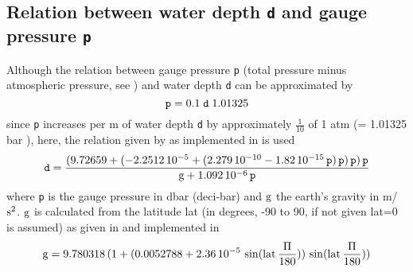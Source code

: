 \documentclass[a4paper]{article}
\begin{document}
\subsection{Relation between water depth \texttt{d} and gauge pressure \texttt{p}}
Although the relation between gauge pressure \texttt{p} (total pressure minus atmospheric pressure, see \cite{Feistel2008})  and water depth \texttt{d} can be approximated by 
\begin{equation}
 \rm \mbox{\texttt{p}} = 0.1\;\mbox{\texttt{d}}\;1.01325
\end{equation}
since \texttt{p} increases per m of water depth \texttt{d} by approximately $\frac{1}{10}$ of 1 atm (= 1.01325 bar \citet[chap. 5, p. 3]{Dickson2007}),
here, the relation given by \cite{Fofonoff1983} as implemented in \cite{marelac} is used
\begin{equation}
\rm \mbox{\texttt{d}} = \frac{(9.72659 + (-2.2512\,10^{-5} + (2.279\,10^{-10} - 1.82\,10^{-15} \, \mbox{\texttt{p}}) \, \mbox{\texttt{p}})\, \mbox{\texttt{p}})\, \mbox{\texttt{p}}}{g + 1.092\,10^{-6} \, \mbox{\texttt{p}}}
\end{equation}
where \mbox{\texttt{p}} is the gauge pressure in dbar (deci-bar) and $\rm g$ the earth's gravity in m/$\rm s^2$. $\rm g$ is calculated from the latitude lat (in degrees, -90 to 90, if not given lat=0 is assumed) as given in \cite{Fofonoff1983}
and implemented in \cite{marelac}
\begin{equation}
\rm g = 9.780318\, (1+ ( 0.0052788 + 2.36\,10^{-5}\,\sin(lat\,\frac{\Pi}{180}))\,\sin(lat\,\frac{\Pi}{180}))
\end{equation}
\end{document}

